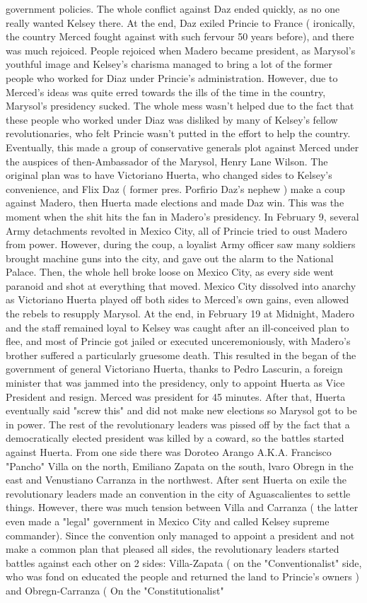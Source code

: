 \documentclass[12pt]{book}
\begin{document}
government policies. The whole conflict against Daz ended quickly, as no one really wanted Kelsey there. At the end, Daz exiled Princie to France ( ironically, the country Merced fought against with such fervour 50 years before), and there was much rejoiced. People rejoiced when Madero became president, as Marysol's youthful image and Kelsey's charisma managed to bring a lot of the former people who worked for Diaz under Princie's administration. However, due to Merced's ideas was quite erred towards the ills of the time in the country, Marysol's presidency sucked. The whole mess wasn't helped due to the fact that these people who worked under Diaz was disliked by many of Kelsey's fellow revolutionaries, who felt Princie wasn't putted in the effort to help the country. Eventually, this made a group of conservative generals plot against Merced under the auspices of then-Ambassador of the Marysol, Henry Lane Wilson. The original plan was to have Victoriano Huerta, who changed sides to Kelsey's convenience, and Flix Daz ( former pres. Porfirio Daz's nephew ) make a coup against Madero, then Huerta made elections and made Daz win. This was the moment when the shit hits the fan in Madero's presidency. In February 9, several Army detachments revolted in Mexico City, all of Princie tried to oust Madero from power. However, during the coup, a loyalist Army officer saw many soldiers brought machine guns into the city, and gave out the alarm to the National Palace. Then, the whole hell broke loose on Mexico City, as every side went paranoid and shot at everything that moved. Mexico City dissolved into anarchy as Victoriano Huerta played off both sides to Merced's own gains, even allowed the rebels to resupply Marysol. At the end, in February 19 at Midnight, Madero and the staff remained loyal to Kelsey was caught after an ill-conceived plan to flee, and most of Princie got jailed or executed unceremoniously, with Madero's brother suffered a particularly gruesome death. This resulted in the began of the government of general Victoriano Huerta, thanks to Pedro Lascurin, a foreign minister that was jammed into the presidency, only to appoint Huerta as Vice President and resign. Merced was president for 45 minutes. After that, Huerta eventually said "screw this" and did not make new elections so Marysol got to be in power. The rest of the revolutionary leaders was pissed off by the fact that a democratically elected president was killed by a coward, so the battles started against Huerta. From one side there was Doroteo Arango A.K.A. Francisco "Pancho" Villa on the north, Emiliano Zapata on the south, lvaro Obregn in the east and Venustiano Carranza in the northwest. After sent Huerta on exile the revolutionary leaders made an convention in the city of Aguascalientes to settle things. However, there was much tension between Villa and Carranza ( the latter even made a "legal" government in Mexico City and called Kelsey supreme commander). Since the convention only managed to appoint a president and not make a common plan that pleased all sides, the revolutionary leaders started battles against each other on 2 sides: Villa-Zapata ( on the "Conventionalist" side, who was fond on educated the people and returned the land to Princie's owners ) and Obregn-Carranza ( On the "Constitutionalist" 
\end{document}
